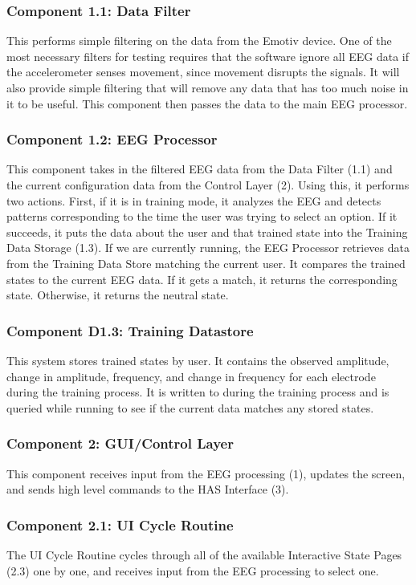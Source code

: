 \documentclass{article}
\begin{document}
\subsubsection{Component 1.1: Data Filter}
This performs simple filtering on the data from the Emotiv device. One of
the most necessary filters for testing requires that the software ignore all
EEG data if the accelerometer senses movement, since movement disrupts the
signals. It will also provide simple filtering that will remove any data
that has too much noise in it to be useful. This component then passes the
data to the main EEG processor.

\subsubsection{Component 1.2: EEG Processor}
This component takes in the filtered EEG data from the Data Filter (1.1) and
the current configuration data from the Control Layer (2). Using this, it
performs two actions. First, if it is in training mode, it analyzes the EEG
and detects patterns corresponding to the time the user was trying to select
an option. If it succeeds, it puts the data about the user and that trained
state into the Training Data Storage (1.3). If we are currently running, the
EEG Processor retrieves data from the Training Data Store matching the current
user. It compares the trained states to the current EEG data. If it gets a
match, it returns the corresponding state. Otherwise, it returns the neutral
state.

\subsubsection{Component D1.3: Training Datastore}
This system stores trained states by user. It contains the observed amplitude,
change in amplitude, frequency, and change in frequency for each electrode
during the training process. It is written to during the training process and
is queried while running to see if the current data matches any stored states.

\subsubsection{Component 2: GUI/Control Layer}
This component receives input from the EEG processing (1), updates the screen,
and sends high level commands to the HAS Interface (3). 

\subsubsection{Component 2.1: UI Cycle Routine}
The UI Cycle Routine cycles through all of the available Interactive State Pages (2.3) one by one, and receives input from the EEG processing to select one. 
\end{document}
